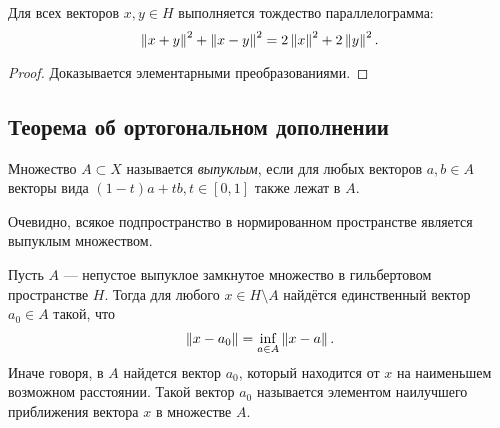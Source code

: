\begin{theorem}
    Для всех векторов $x, y \in H$ выполняется тождество параллелограмма:
    \[ \left\|x + y\right\|^2 + \left\|x - y\right\|^2 = 2\left\|x\right\|^2 + 2\left\|y\right\|^2. \]
\end{theorem}

\begin{proof}
    Доказывается элементарными преобразованиями.
\end{proof}

\subsection{Теорема об ортогональном дополнении}
\begin{definition}
    Множество $A \subset X$ называется \emph{выпуклым}, если для любых векторов $a, b
    \in A$ векторы вида $(1-t) a + t b, t \in [0, 1]$ также лежат в $A$.
\end{definition}

Очевидно, всякое подпространство в нормированном пространстве является выпуклым
множеством.

\begin{theorem}
    Пусть $A$ --- непустое выпуклое замкнутое множество в гильбертовом пространстве $H$.
    Тогда для любого $x \in H \setminus A$ найдётся единственный вектор $a_0 \in
    A$ такой, что
    \[ \left\|x - a_0\right\| = \inf_{a \in A} \left\|x - a\right\|. \]
    Иначе говоря, в $A$ найдется вектор $a_0$, который находится от $x$ на наименьшем
    возможном расстоянии. Такой вектор $a_0$ называется элементом наилучшего
    приближения вектора $x$ в множестве $A$.
\end{theorem}

